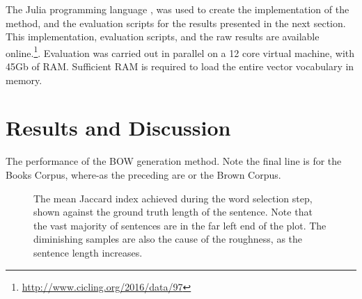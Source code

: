 \documentclass{book}
\begin{document}
The Julia programming language \parencite{Julia}, was used to create the implementation of the method, and the evaluation scripts for the results presented in the next section. This implementation, evaluation scripts, and the raw results are available online.\footnote{\url{http://www.cicling.org/2016/data/97}}. Evaluation was carried out in parallel on a 12 core virtual machine, with 45Gb of RAM. Sufficient RAM is required to load the entire vector vocabulary in memory.


\section{Results and Discussion} \label{results}



\begin{table}
	\caption{\label{table:overall} The performance of the BOW generation method. Note the final line is for the Books Corpus, where-as the preceding are or the Brown Corpus.}
\end{table}


\begin{figure}




	\caption{\label{figure:exactlenscore} The mean Jaccard index achieved during the word selection step, shown against the ground truth length of the sentence. Note that the vast majority of sentences are in the far left end of the plot. The diminishing samples are also the cause of the roughness, as the sentence length increases.}
\end{figure}
\end{document}
